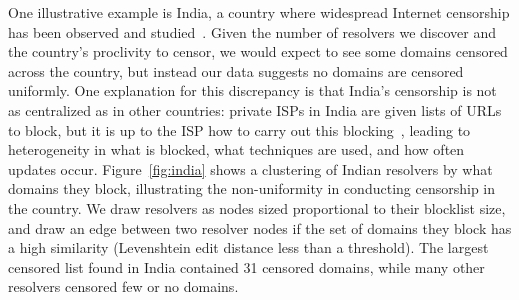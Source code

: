    One illustrative example is India, a country where widespread Internet censorship has
    been observed and studied~\cite{singh2020india,Yadav2018a}. Given the number
    of resolvers we discover and the country's proclivity to censor, we would expect to see
    some domains censored across the country, but instead our data suggests no
    domains are censored uniformly. One explanation for this discrepancy is that
    India's censorship is not as centralized as in other countries: private ISPs in
    India are given lists of URLs to block, but it is up to the ISP how to carry out
    this blocking~\cite{Gosain2017a}, leading to heterogeneity in what is blocked,
    what techniques are used, and how often updates occur.  Figure~\ref{fig:india}
    shows a clustering of Indian resolvers by what domains they block, illustrating the non-uniformity in
    conducting censorship in the country. We draw resolvers as nodes sized proportional
    to their blocklist size, and draw an edge between two resolver
    nodes if the set of domains they block has a high similarity (Levenshtein edit
    distance less than a threshold). The largest censored list found in India contained 31
    censored domains, while many other resolvers censored few or no domains.


    \FigIndiaCluster
\fi


